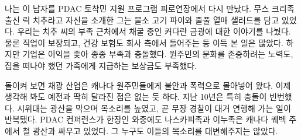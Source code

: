 \documentclass{translation}
\begin{document}
나는 이 남자를 PDAC 토착민 지원 프로그램 피로연장에서 다시 만났다.
무스 크리족 출신 릭 치추라고 자신을 소개한 그는 물소 고기 파이와 줄풀 열매 샐러드를 담고 있었다.
우리는 치추 씨의 부족 근처에서 채굴 중인 커다란 금광에 대한 이야기를 나눴다.
물론 직업이 보장되고, 건강 보험도 회사 측에서 들어주는 등 이득 본 일은 많았다.
하지만 기업은 이익을 좇아 종종 부족과 충돌했다.
원주민의 문화를 존중하려는 노력도, 집을 떠나야 했던 가족에게 지급하는 보상금도 부족했다.
% 

돌이켜 보면 채광 산업은 캐나다 원주민들에게 불안과 폭력으로 몰아넣어 왔다.
이제 생각해 봐도 예전과 딱히 달라진 점은 없는 듯 하다.
지난 10년은 특히 충돌이 빈번했다.
시위대는 광산을 막으며 목소리를 높였고, 곧 무장 경찰이 대거 연행해 가는 일이 반복됐다.
PDAC 컨퍼런스가 한장인 와중에도 나스카피족과 이누족은 캐나다 퀘벡 주에서 철 광산과 싸우고 있었다.
그 누구도 이들의 목소리를 대변해주지는 않았다.
\end{document}
